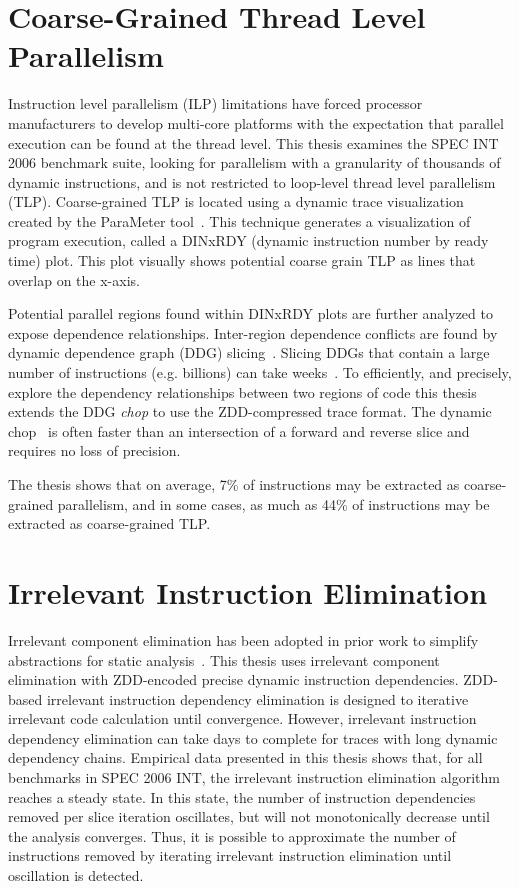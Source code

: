 \documentclass[defaultstyle,11pt]{thesis}
\begin{document}
\section{Coarse-Grained Thread Level Parallelism}

Instruction level parallelism (ILP) limitations have forced processor
manufacturers to develop multi-core platforms with the expectation
that parallel execution can be found at the thread level. This thesis
examines the SPEC INT 2006 benchmark suite, looking for parallelism
with a granularity of thousands of dynamic instructions, and is not
restricted to loop-level thread level parallelism (TLP).
Coarse-grained TLP is located using a dynamic trace visualization
created by the ParaMeter tool~\cite{price:08:pact}.  This technique
generates a visualization of program execution, called a DINxRDY
(dynamic instruction number by ready time) plot.  This plot visually
shows potential coarse grain TLP as lines that overlap on the x-axis.

Potential parallel regions found within DINxRDY plots are further
analyzed to expose dependence relationships.  Inter-region dependence
conflicts are found by dynamic dependence graph (DDG)
slicing~\cite{gallager:91:se,agrawal:90:pldi,agrawal:92:thesis,korel:88:ipl}.
Slicing DDGs that contain a large number of instructions
(e.g. billions) can take weeks~\cite{agrawal:90:pldi, zhang:03:icse}.
To efficiently, and precisely, explore the dependency relationships
between two regions of code this thesis extends the DDG \textit{chop}
to use the ZDD-compressed trace format.  The dynamic
chop~\cite{gupta:2005:ase, krinke:2004:sqc} is often faster than an
intersection of a forward and reverse slice and requires no loss of
precision.

The thesis shows that on average, 7\% of instructions may be extracted
as coarse-grained parallelism, and in some cases, as much as 44\% of
instructions may be extracted as coarse-grained TLP.

\section{Irrelevant Instruction Elimination}

Irrelevant component elimination has been adopted in prior work to
simplify abstractions for static analysis~\cite{corbett:icsc:2000}.
This thesis uses irrelevant component elimination with ZDD-encoded
precise dynamic instruction dependencies.  ZDD-based irrelevant
instruction dependency elimination is designed to iterative irrelevant
code calculation until convergence.  However, irrelevant instruction
dependency elimination can take days to complete for traces with long
dynamic dependency chains. Empirical data presented in this thesis
shows that, for all benchmarks in SPEC 2006 INT, the irrelevant
instruction elimination algorithm reaches a steady state.  In this
state, the number of instruction dependencies removed per slice
iteration oscillates, but will not monotonically decrease until the
analysis converges.  Thus, it is possible to approximate the number of
instructions removed by iterating irrelevant instruction elimination
until oscillation is detected.
\end{document}

